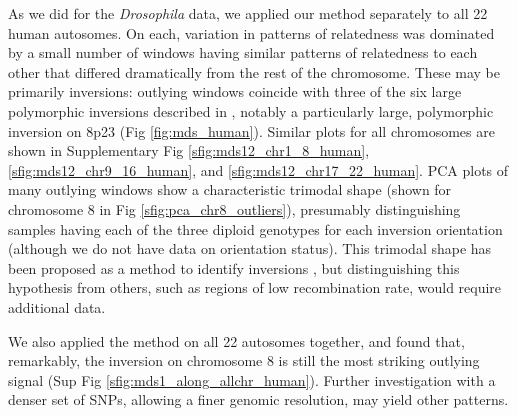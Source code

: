 \documentclass[11pt, oneside]{article}   	%
\newcommand\citet{\cite}
\newcommand\citep{\cite}
\newcommand{\Figure}{Fig }
\newcommand{\Figures}{Fig }
\newcommand{\SFigure}{Sup Fig }
\newcommand{\Figure}{{Figure }}
\newcommand{\Figures}{{Figures }}
\newcommand{\SFigure}{{Supplementary Figure }}
\begin{document}
As we did for the \textit{Drosophila} data, we applied our method separately to all 22 human autosomes.
On each, variation in patterns of relatedness was dominated by a small number of windows
having similar patterns of relatedness to each other that differed dramatically from the rest of the chromosome.
These may be primarily inversions: outlying windows coincide with
three of the six large polymorphic inversions described in \citet{antonacci2009characterization},
notably a particularly large, polymorphic inversion on 8p23 (\Figure \ref{fig:mds_human}). 
Similar plots for all chromosomes are shown
in Supplementary \Figures \ref{sfig:mds12_chr1_8_human}, \ref{sfig:mds12_chr9_16_human}, and \ref{sfig:mds12_chr17_22_human}.
PCA plots of many outlying windows show a characteristic trimodal shape 
(shown for chromosome 8 in \Figure \ref{sfig:pca_chr8_outliers}),
presumably distinguishing samples having each of the three diploid genotypes for each inversion orientation
(although we do not have data on orientation status).
This trimodal shape has been proposed as a method to identify inversions \citep{ma2012investigation},
but distinguishing this hypothesis from others,
such as regions of low recombination rate,
would require additional data.

We also applied the method on all 22 autosomes together, 
and found that, remarkably, 
the inversion on chromosome 8 is still the most striking outlying signal (\SFigure \ref{sfig:mds1_along_allchr_human}). 
Further investigation with a denser set of SNPs,
allowing a finer genomic resolution,
may yield other patterns.
\end{document}
